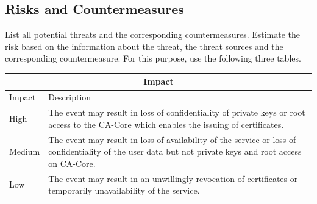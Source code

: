 \documentclass{article}
\begin{document}
\subsection{Risks and Countermeasures}

List all potential threats and the
  corresponding countermeasures. Estimate the risk based on 
  the information about the threat, the threat sources and the 
  corresponding countermeasure. For this purpose, use the following three
  tables.


\begin{center}
\begin{tabular}{|l|p{10cm}|}
\hline
\multicolumn{2}{|c|}{\bf Impact} \\
\hline
Impact & Description \\
\hline
\hline
High   & \hspace*{20pt}
The event may result in loss of confidentiality of private keys or root access to the CA-Core which enables the issuing of certificates. \\
\hline
Medium & \hspace*{20pt}
The event may result in loss of availability of the service or loss of confidentiality of the user data but not private keys and root access on CA-Core. \\
\hline
Low   & \hspace*{20pt}
The event may result in an unwillingly revocation of certificates or temporarily unavailability of the service. \\
\hline
\end{tabular}
%
\vspace{5mm}
%



\end{center}
\end{document}
